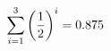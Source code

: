 \documentclass[preview]{standalone}
\begin{document}
\begin{align*}
\sum_{i=1}^{ 3 } \left({ 1 } \over {2} \right)^i = { 0.875 }
\end{align*}
\end{document}
